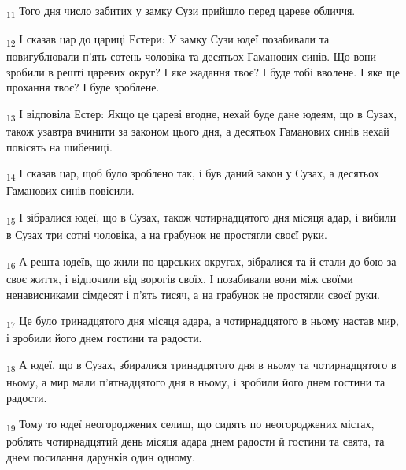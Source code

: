 \begin{tcolorbox}
\textsubscript{11} Того дня число забитих у замку Сузи прийшло перед цареве обличчя.
\end{tcolorbox}
\begin{tcolorbox}
\textsubscript{12} І сказав цар до цариці Естери: У замку Сузи юдеї позабивали та повигублювали п'ять сотень чоловіка та десятьох Гаманових синів. Що вони зробили в решті царевих округ? І яке жадання твоє? І буде тобі вволене. І яке ще прохання твоє? І буде зроблене.
\end{tcolorbox}
\begin{tcolorbox}
\textsubscript{13} І відповіла Естер: Якщо це цареві вгодне, нехай буде дане юдеям, що в Сузах, також узавтра вчинити за законом цього дня, а десятьох Гаманових синів нехай повісять на шибениці.
\end{tcolorbox}
\begin{tcolorbox}
\textsubscript{14} І сказав цар, щоб було зроблено так, і був даний закон у Сузах, а десятьох Гаманових синів повісили.
\end{tcolorbox}
\begin{tcolorbox}
\textsubscript{15} І зібралися юдеї, що в Сузах, також чотирнадцятого дня місяця адар, і вибили в Сузах три сотні чоловіка, а на грабунок не простягли своєї руки.
\end{tcolorbox}
\begin{tcolorbox}
\textsubscript{16} А решта юдеїв, що жили по царських округах, зібралися та й стали до бою за своє життя, і відпочили від ворогів своїх. І позабивали вони між своїми ненависниками сімдесят і п'ять тисяч, а на грабунок не простягли своєї руки.
\end{tcolorbox}
\begin{tcolorbox}
\textsubscript{17} Це було тринадцятого дня місяця адара, а чотирнадцятого в ньому настав мир, і зробили його днем гостини та радости.
\end{tcolorbox}
\begin{tcolorbox}
\textsubscript{18} А юдеї, що в Сузах, збиралися тринадцятого дня в ньому та чотирнадцятого в ньому, а мир мали п'ятнадцятого дня в ньому, і зробили його днем гостини та радости.
\end{tcolorbox}
\begin{tcolorbox}
\textsubscript{19} Тому то юдеї неогороджених селищ, що сидять по неогороджених містах, роблять чотирнадцятий день місяця адара днем радости й гостини та свята, та днем посилання дарунків один одному.
\end{tcolorbox}
